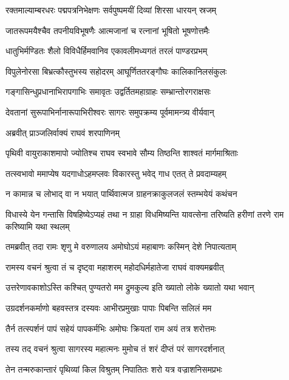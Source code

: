 \twolineshloka
{रक्तमाल्याम्बरधरः पद्मपत्रनिभेक्षणः}
{सर्वपुष्पमयीं दिव्यां शिरसा धारयन् स्रजम्} %

\twolineshloka
{जातरूपमयैश्चैव तपनीयविभूषणैः}
{आत्मजानां च रत्नानां भूषितो भूषणोत्तमैः} %

\twolineshloka
{धातुभिर्मण्डितः शैलो विविधैर्हिमवानिव}
{एकावलीमध्यगतं तरलं पाण्डरप्रभम्} %

\twolineshloka
{विपुलेनोरसा बिभ्रत्कौस्तुभस्य सहोदरम्}
{आघूर्णिततरङ्गौघः कालिकानिलसंकुलः} %

\twolineshloka
{गङ्गासिन्धुप्रधानाभिरापगाभिः समावृतः}
{उद्वर्तितमहाग्राहः सम्भ्रान्तोरगराक्षसः} %

\twolineshloka
{देवतानां सुरूपाभिर्नानारूपाभिरीश्वरः}
{सागरः समुपक्रम्य पूर्वमामन्त्र्य वीर्यवान्} %

\onelineshloka
{अब्रवीत् प्राञ्जलिर्वाक्यं राघवं शरपाणिनम्} %

\twolineshloka
{पृथिवी वायुराकाशमापो ज्योतिश्च राघव}
{स्वभावे सौम्य तिष्ठन्ति शाश्वतं मार्गमाश्रिताः} %

\twolineshloka
{तत्स्वभावो ममाप्येष यदगाधोऽहमप्लवः}
{विकारस्तु भवेद् गाध एतत् ते प्रवदाम्यहम्} %

\twolineshloka
{न कामान्न च लोभाद् वा न भयात् पार्थिवात्मज}
{ग्राहनक्राकुलजलं स्तम्भयेयं कथंचन} %

\threelineshloka
{विधास्ये येन गन्तासि विषहिष्येऽप्यहं तथा}
{न ग्राहा विधमिष्यन्ति यावत्सेना तरिष्यति}
{हरीणां तरणे राम करिष्यामि यथा स्थलम्} %

\twolineshloka
{तमब्रवीत् तदा रामः शृणु मे वरुणालय}
{अमोघोऽयं महाबाणः कस्मिन् देशे निपात्यताम्} %

\twolineshloka
{रामस्य वचनं श्रुत्वा तं च दृष्ट्वा महाशरम्}
{महोदधिर्महातेजा राघवं वाक्यमब्रवीत्} %

\twolineshloka
{उत्तरेणावकाशोऽस्ति कश्चित् पुण्यतरो मम}
{द्रुमकुल्य इति ख्यातो लोके ख्यातो यथा भवान्} %

\twolineshloka
{उग्रदर्शनकर्माणो बहवस्तत्र दस्यवः}
{आभीरप्रमुखाः पापाः पिबन्ति सलिलं मम} %

\twolineshloka
{तैर्न तत्स्पर्शनं पापं सहेयं पापकर्मभिः}
{अमोघः क्रियतां राम अयं तत्र शरोत्तमः} %

\twolineshloka
{तस्य तद् वचनं श्रुत्वा सागरस्य महात्मनः}
{मुमोच तं शरं दीप्तं परं सागरदर्शनात्} %

\twolineshloka
{तेन तन्मरुकान्तारं पृथिव्यां किल विश्रुतम्}
{निपातितः शरो यत्र वज्राशनिसमप्रभः} %

